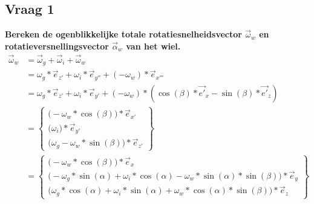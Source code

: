 \documentclass[a4paper,10pt]{article}
\begin{document}
\subsection{Vraag 1}
\textbf{Bereken de ogenblikkelijke totale rotatiesnelheidsvector $\vec{\omega}_{w}$ en rotatieversnellingsvector $\vec{\alpha}_{w}$ van het wiel.}\\


\begin{equation} 
\begin{aligned}
	\vec{\omega}_{w} &= \vec{\omega}_{g} + \vec{\omega}_{i} + \vec{\omega}_{w} \\
	& = {\omega}_g * \vec{e}_{z'} + {\omega}_i * \vec{e}_{y''} +(-{\omega}_w)*\vec{e}_{x'''}\\
	& =  {\omega}_g * \vec{e}_{z'} + {\omega}_i * \vec{e}_{y'} +(-{\omega}_w)*(\cos(\beta)*\vec{e'}_{x}-\sin(\beta)*\vec{e'}_{z})\\
	&=\begin{Bmatrix}
	\Big(-\omega_w*\cos(\beta)\Big)*\vec{e}_{x'} \\
	\Big(\omega_i\Big)*\vec{e}_{y'}\\
	\Big(\omega_g-\omega_w*\sin(\beta)\Big)*\vec{e}_{z'}
	\end{Bmatrix}\\
	& = \begin{Bmatrix}
	\Big(- {\omega}_{w} * \cos(\beta)\Big)*\vec{e}_x \\
	\Big(- {\omega}_{g} * \sin(\alpha) + {\omega}_{i} * \cos(\alpha) - {\omega}_{w} * \sin(\alpha)*\sin(\beta) \Big) *\vec{e}_y \\
	\Big({\omega}_{g} * \cos(\alpha) + {\omega}_{i} * \sin(\alpha) + {\omega}_{w} * \cos(\alpha)*\sin(\beta)\Big) *\vec{e}_z
	\end{Bmatrix} 
\end{aligned}
\end{equation}\\
\end{document}
